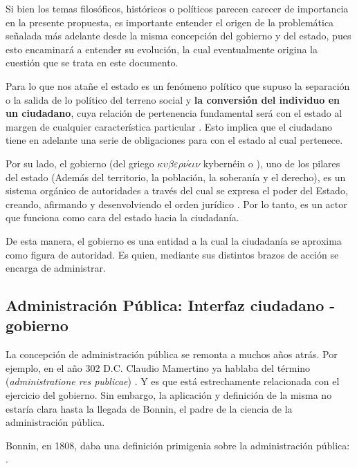 Si bien los temas filosóficos, históricos o políticos parecen carecer de
importancia en la presente propuesta, es importante entender el origen de la
problemática señalada más adelante desde la misma concepción del gobierno y del
estado, pues esto encaminará a entender su evolución, la cual eventualmente
origina la cuestión que se trata en este documento.

Para lo que nos atañe el estado es un fenómeno político que supuso
la separación o la salida de lo político del terreno social y \textbf{la
    conversión del individuo en un ciudadano}, cuya relación de pertenencia
fundamental será con el estado al margen de cualquier característica particular
\cite{gordilloperezPorQueSurge2017}. Esto implica que el ciudadano tiene en adelante
una serie de obligaciones para con el estado al cual pertenece.

Por su lado, el gobierno (del griego
$\kappa \upsilon \beta \varepsilon \rho \nu \acute{\epsilon} \iota \nu$
kybernéin  o ), uno de los pilares del estado (Además del territorio, la población, la soberanía y el derecho), es un
sistema orgánico de autoridades a través del cual se expresa el poder del
Estado, creando, afirmando y desenvolviendo el orden jurídico
\cite{fernandezruizDerechoParlamentario2023}. Por lo tanto, es un actor que
funciona como cara del estado hacia la ciudadanía.

De esta manera, el gobierno es una entidad a la cual la ciudadanía se aproxima como figura de autoridad. Es quien, mediante sus distintos brazos de acción se encarga de administrar.

\subsection{Administración Pública: Interfaz ciudadano - gobierno}

La concepción de administración pública se remonta a muchos años atrás. Por
ejemplo, en el año 302 D.C. Claudio Mamertino ya hablaba del término
 (\textit{administratione res publicae})
\cite{nixonPraiseLaterRoman1994}. Y es que está estrechamente relacionada con el
ejercicio del gobierno. Sin embargo, la aplicación y definición de la misma no
estaría clara hasta la llegada de Bonnin, el padre de la ciencia de la
administración pública.

Bonnin, en 1808, daba una definición primigenia sobre la administración pública:
 \cite{guerreroCharlesJeanBonninSiglo2020}.

